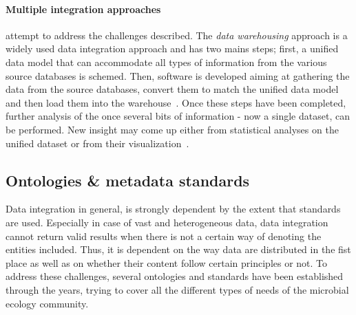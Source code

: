       \paragraph{Multiple integration approaches} attempt to address the challenges described. 
      The \textit{data warehousing} approach is a widely used data integration approach and has two mains steps; 
      first, a unified data model that can accommodate all types of  
      information from the various source databases is schemed.
      Then, software is developed aiming at  
      gathering the data from the source databases, 
      convert them to match the unified data model and 
      then load them into the warehouse~\cite{stein2003integrating}.
      Once these steps have been completed, further analysis of the once
      several bits of information - now a single dataset, can be performed.
      New insight may come up either from statistical analyses on the unified
      dataset or from their visualization~\cite{leonelli2013integrating}.  

      

   \subsection{Ontologies \& metadata standards}

      Data integration in general, 
      is strongly dependent by the extent that standards are used. 
      Especially in case of vast and heterogeneous data, 
      data integration cannot return valid results 
      when there is not a certain way
      of denoting the entities included.
      Thus, it is dependent on the way data are distributed in the fist place 
      as well as on whether their content follow certain principles or not. 
      To address these challenges, several ontologies and standards have 
      been established through the years, trying to cover all the different 
      types of needs of the microbial ecology community. 

